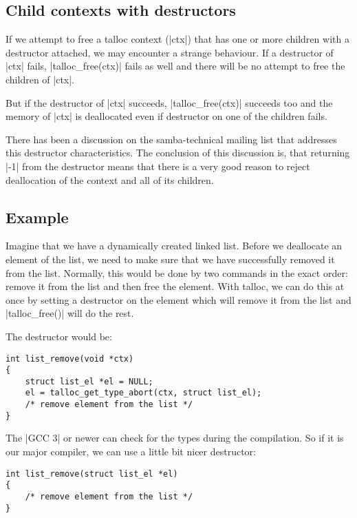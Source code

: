 \subsection{Child contexts with destructors}

If we attempt to free a talloc context (|ctx|) that has one or more children
with a destructor attached, we may encounter a strange behaviour. If a
destructor of |ctx| fails, |talloc_free(ctx)| fails as well and there will
be no attempt to free the children of |ctx|.

But if the destructor of |ctx| succeeds, |talloc_free(ctx)| succeeds too and
the memory of |ctx| is deallocated even if destructor on one of the children
fails.

There has been a discussion on the samba-technical mailing list that addresses
this destructor characteristics. The conclusion of this discussion is, that
returning |-1| from the destructor means that there is a very good reason to
reject deallocation of the context and all of its
children\cite{MailListDestructors}.

\subsection{Example}

Imagine that we have a dynamically created linked list. Before we deallocate an
element of the list, we need to make sure that we have successfully removed it
from the list. Normally, this would be done by two commands in the exact order:
remove it from the list and then free the element. With talloc, we can do this
at once by setting a destructor on the element which will remove it from the
list and |talloc_free()| will do the rest.

The destructor would be:

\begin{lstlisting}[caption={Remove an element from the list -- destructor}]
int list_remove(void *ctx)
{
    struct list_el *el = NULL;
    el = talloc_get_type_abort(ctx, struct list_el);
    /* remove element from the list */    
}
\end{lstlisting}

\noindent
The |GCC 3| or newer can check for the types during the compilation. So if it is
our major compiler, we can use a little bit nicer destructor:

\begin{lstlisting}[caption={Remove an element from the list -- type-safe
destructor}]
int list_remove(struct list_el *el)
{
    /* remove element from the list */    
}
\end{lstlisting}

